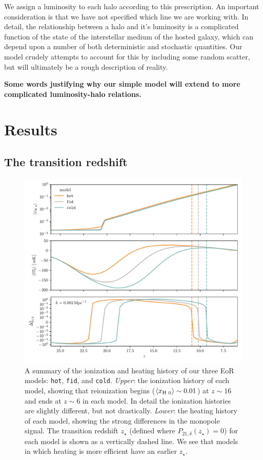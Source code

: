 \documentclass[a4paper,fleqn,usenatbib]{mnras}
\newcommand{\avg}[1]{\ensuremath{\langle #1 \rangle}}
\newcommand{\HII}{\ensuremath{\text{H~\textsc{ii}}}}
\newcommand{\fid}{\texttt{fid}}
\newcommand{\hot}{\texttt{hot}}
\newcommand{\cold}{\texttt{cold}}
\newcommand{\zst}{\ensuremath{z_{\star}}}
\begin{document}
We assign a luminosity to each halo according to this prescription. An
important consideration is that we have not specified which line we are
working with. In detail, the relationship between a halo and it's luminosity
is a complicated function of the state of the interstellar medium of the
hosted galaxy, which can depend upon a number of both deterministic and
stochastic quantities. Our model crudely attempts to account for this by
including some random scatter, but will ultimately be a rough description of
reality.

{\bf Some words justifying why our simple model will extend to more
complicated luminosity-halo relations.}

\section{Results} \label{sec:results}
\subsection{The transition redshift} \label{ssec:ztran_results}

\begin{figure}
\includegraphics[width=\textwidth]{plots/aveTb_nf.pdf}
\caption{A summary of the ionization and heating history of our three EoR
models: \hot{}, \fid{}, and \cold{}. \textit{Upper}: the ionization history of
each model, showing that reionization begins ($\avg{x_{\HII}}\sim0.01$) at
$z\sim16$ and ends at $z\sim6$ in each model. In detail the ionization
histories are slightly different, but not drastically. \textit{Lower}: the
heating history of each model, showing the strong differences in the monopole
signal. The transition redshift \zst{} (defined where $P_{21,\delta}(\zst{}) =
0$) for each model is shown as a vertically dashed line. We see that models in
which heating is more efficient have an earlier \zst{}.}
\label{fig:aveTb_nf}
\end{figure}
\end{document}
